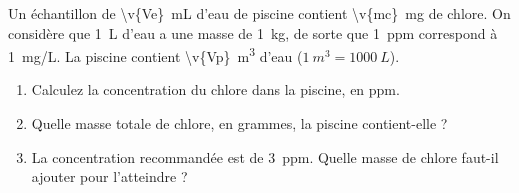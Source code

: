 Un échantillon de \qty{\v{Ve}}{mL} d'eau de piscine contient \qty{\v{mc}}{mg} de chlore. On considère que \qty{1}{L} d'eau a une masse de \qty{1}{kg}, de sorte que \qty{1}{ppm} correspond à \qty{1}{mg/L}. La piscine contient \qty{\v{Vp}}{m^3} d'eau ($\qty{1}{m^3} = \qty{1000}{L}$).

\begin{enumerate}[label=\alph*)]
    \item Calculez la concentration du chlore dans la piscine, en ppm.
    \item Quelle masse totale de chlore, en grammes, la piscine contient-elle ?
    \item La concentration recommandée est de \qty{3}{ppm}. Quelle masse de chlore faut-il ajouter pour l'atteindre ?
\end{enumerate}
